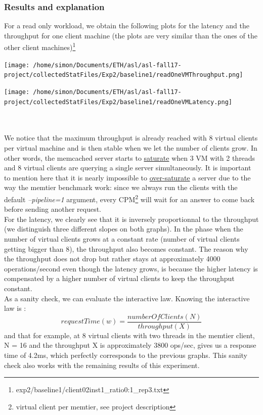 \documentclass[11pt,a4paper]{article}
\begin{document}
\subsubsection{Results and explanation}
For a read only workload, we obtain the following plots for the latency and the throughput for one client machine (the plots are very similar than the ones of the other client machines)\footnote{exp2/baseline1/client02inst1\_ratio0:1\_rep3.txt}
\\
\begin{minipage}{0.5\linewidth}
\texttt{[image: /home/simon/Documents/ETH/asl/asl-fall17-project/collectedStatFiles/Exp2/baseline1/readOneVMThroughput.png]}
\end{minipage}
\hfill
\begin{minipage}{0.5\linewidth}
\texttt{[image: /home/simon/Documents/ETH/asl/asl-fall17-project/collectedStatFiles/Exp2/baseline1/readOneVMLatency.png]}
\end{minipage}
\\\\
We notice that the maximum throughput is already reached with 8 virtual clients per virtual machine and is then stable when we let the number of clients grow. In other words, the memcached server starts to \underline{saturate} when 3 VM with 2 threads and 8 virtual clients are querying a single server simultaneously. It is important to mention here that it is nearly impossible to \underline{over-saturate} a server due to the way the memtier benchmark work: since we always run the clients with the default \textit{--pipeline=1} argument, every CPM\footnote{virtual client per memtier, see project description} will wait for an answer to come back before sending another request.
\\
For the latency, we clearly see that it is inversely proportionnal to the throughput (we distinguish three different slopes on both graphs). In the phase when the number of virtual clients grows at a constant rate (number of virtual clients getting bigger than 8), the throughput also becomes constant. The reason why the throughput does not drop but rather stays at approximately 4000 operations/second even though the latency grows, is because the higher latency is compensated by a higher number of virtual clients to keep the throughput constant. 
\\As a sanity check, we can evaluate the interactive law. Knowing the interactive law is : \[ request Time (w) = \frac{number Of Clients (N)}{throughput (X)}\] and that for example, at 8 virtual clients with two threads in the memtier client, N = 16 and the throughput X is approximately 3800 ops/sec, gives us a response time of 4.2ms, which perfectly corresponds to the previous graphs. This sanity check also works with the remaining results of this experiment. 
\end{document}
